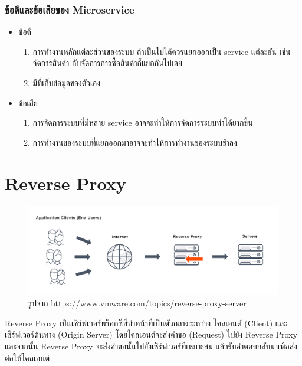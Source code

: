 \subsubsection{ข้อดีและข้อเสียของ Microservice}
\begin{itemize}
  \item ข้อดี
  \begin{enumerate}
    \item การทำงานหลักแต่ละส่วนของระบบ ถ้าเป็นไปได้ควรแยกออกเป็น service แต่ละอัน เช่นจัดการสินค้า กับจัดการการซื้อสินค้าก็แยกกันไปเลย
    \item มีที่เก็บข้อมูลของตัวเอง
  \end{enumerate}
  \item ข้อเสีย
  \begin{enumerate}
    \item การจัดการระบบที่มีหลาย service อาจจะทำให้การจัดการระบบทำได้ยากขึ้น
    \item การทำงานของระบบที่แยกออกมาอาจจะทำให้การทำงานของระบบช้าลง
  \end{enumerate}
\end{itemize}
\clearpage

\section{Reverse Proxy}
\begin{figure}[H]
  \centering
  \includegraphics[width=\linewidth, keepaspectratio]{pictures/reverse_proxy.png}
  \caption[Poem]{รูปจาก https://www.vmware.com/topics/reverse-proxy-server}
  \label{fig:reverse-proxy}
\end{figure}

\hspace{1.27cm}Reverse Proxy\cite{ReverseProxy} เป็นเซิร์ฟเวอร์พร็อกซีที่ทำหน้าที่เป็นตัวกลางระหว่าง ไคลเอนต์ (Client) และ เซิร์ฟเวอร์ต้นทาง (Origin Server) โดยไคลเอนต์จะส่งคำขอ (Request) ไปยัง Reverse Proxy และจากนั้น Reverse Proxy จะส่งคำขอนั้นไปยังเซิร์ฟเวอร์ที่เหมาะสม แล้วรับคำตอบกลับมาเพื่อส่งต่อให้ไคลเอนต์

